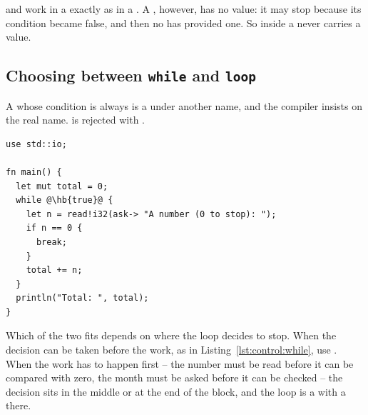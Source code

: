  and  work in a  exactly as in a
. A , however, has no value: it may stop because its
condition became false, and then no  has provided one. So
 inside a  never carries a value.

\subsection{Choosing between \texttt{while} and \texttt{loop}}

A  whose condition is always  is a  under
another name, and the compiler insists on the real name. 
is rejected with .

\begin{lstlisting}[style=coloredverbatimError, escapechar=@, caption=\token{while true} is written \token{loop}]
use std::io;

fn main() {
  let mut total = 0;
  while @\hb{true}@ {
    let n = read!i32(ask-> "A number (0 to stop): ");
    if n == 0 {
      break;
    }
    total += n;
  }
  println("Total: ", total);
}
\end{lstlisting}

Which of the two fits depends on where the loop decides to stop. When the
decision can be taken before the work, as in Listing~\ref{lst:control:while},
use . When the work has to happen first -- the number must be read
before it can be compared with zero, the month must be asked before it can be
checked -- the decision sits in the middle or at the end of the block, and the
loop is a  with a  there.

